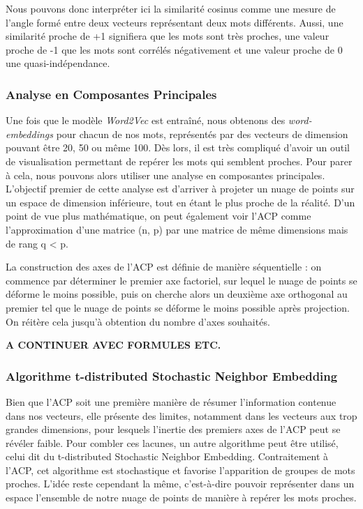 \documentclass[11pt,french,french]{article}
\begin{document}
Nous pouvons donc interpréter ici la similarité cosinus comme une mesure
de l'angle formé entre deux vecteurs représentant deux mots différents.
Aussi, une similarité proche de +1 signifiera que les mots sont très
proches, une valeur proche de -1 que les mots sont corrélés négativement
et une valeur proche de 0 une quasi-indépendance.

\subsubsection{Analyse en Composantes
Principales}\label{analyse-en-composantes-principales}

Une fois que le modèle \emph{Word2Vec} est entraîné, nous obtenons des
\emph{word-embeddings} pour chacun de nos mots, représentés par des
vecteurs de dimension pouvant être 20, 50 ou même 100. Dès lors, il est
très compliqué d'avoir un outil de visualisation permettant de repérer
les mots qui semblent proches. Pour parer à cela, nous pouvons alors
utiliser une analyse en composantes principales. L'objectif premier de
cette analyse est d'arriver à projeter un nuage de points sur un espace
de dimension inférieure, tout en étant le plus proche de la réalité.
D'un point de vue plus mathématique, on peut également voir l'ACP comme
l'approximation d'une matrice (n, p) par une matrice de même dimensions
mais de rang q \textless{} p.

La construction des axes de l'ACP est définie de manière séquentielle :
on commence par déterminer le premier axe factoriel, sur lequel le nuage
de points se déforme le moins possible, puis on cherche alors un
deuxième axe orthogonal au premier tel que le nuage de points se déforme
le moins possible après projection. On réitère cela jusqu'à obtention du
nombre d'axes souhaités.

\textbf{A CONTINUER AVEC FORMULES ETC.}

\subsubsection{Algorithme t-distributed Stochastic Neighbor
Embedding}\label{algorithme-t-distributed-stochastic-neighbor-embedding}

Bien que l'ACP soit une première manière de résumer l'information
contenue dans nos vecteurs, elle présente des limites, notamment dans
les vecteurs aux trop grandes dimensions, pour lesquels l'inertie des
premiers axes de l'ACP peut se révéler faible. Pour combler ces lacunes,
un autre algorithme peut être utilisé, celui dit du t-distributed
Stochastic Neighbor Embedding. Contraitement à l'ACP, cet algorithme est
stochastique et favorise l'apparition de groupes de mots proches. L'idée
reste cependant la même, c'est-à-dire pouvoir représenter dans un espace
l'ensemble de notre nuage de points de manière à repérer les mots
proches.
\end{document}
